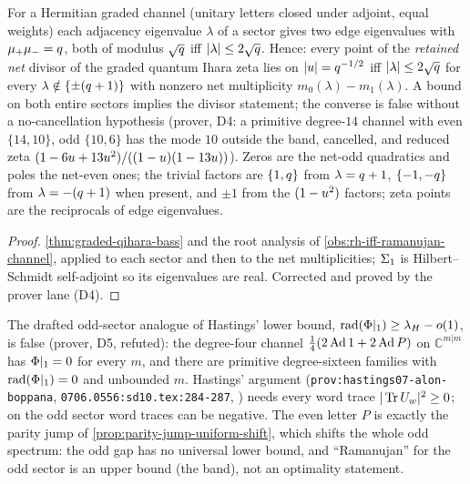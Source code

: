 \begin{corollary}
\label{cor:graded-band-circle}
For a Hermitian graded channel (unitary letters closed under adjoint, equal weights) each
adjacency eigenvalue $\lambda$ of a sector gives two edge eigenvalues with $\mu_+\mu_- =
q$, both of modulus $\sqrt{q}$ iff $|\lambda|\le2\sqrt{q}$. Hence: every point of the
\emph{retained net} divisor of the graded quantum Ihara zeta lies on $|u| = q^{-1/2}$ iff
$|\lambda|\le2\sqrt{q}$ for every $\lambda\notin\{\pm(q+1)\}$ with nonzero net multiplicity
$m_0(\lambda)-m_1(\lambda)$. A bound on both entire sectors implies the divisor statement; the
converse is false without a no-cancellation hypothesis (prover, D4: a primitive degree-$14$ channel
with even $\{14,10\}$, odd $\{10,6\}$ has the mode $10$ outside the band, cancelled, and reduced
zeta $(1-6u+13u^2)/((1-u)(1-13u))$). Zeros are the net-odd quadratics and poles the net-even
ones; the trivial factors are $\{1,q\}$ from $\lambda = q+1$, $\{-1,-q\}$ from $\lambda =
-(q+1)$ when present, and $\pm1$ from the $(1-u^2)$ factors; zeta points are the reciprocals of
edge eigenvalues.
\end{corollary}
\begin{proof}
\cref{thm:graded-qihara-bass} and the root analysis of \cref{obs:rh-iff-ramanujan-channel}, applied
to each sector and then to the net multiplicities; $\Sigma_1$ is Hilbert--Schmidt self-adjoint so its
eigenvalues are real. Corrected and proved by the prover lane (D4).
\end{proof}

\begin{observation}
\label{obs:odd-gap-no-alon-boppana}
The drafted odd-sector analogue of Hastings' lower bound, $\operatorname{rad}(\Phi|_1)\ge\lambda_H-o(1)$, is
false (prover, D5, refuted): the degree-four channel $\tfrac14(2\operatorname{Ad}1+2\operatorname{Ad} P)$ on
$\mathbb C^{m|m}$ has $\Phi|_1 = 0$ for every $m$, and there are primitive degree-sixteen
families with $\operatorname{rad}(\Phi|_1) = 0$ and unbounded $m$. Hastings' argument
(\texttt{prov:hastings07-alon-boppana}, \texttt{0706.0556:sd10.tex:284-287},
{\small\texttt{}})
needs every word trace $|\operatorname{Tr} U_w|^2\ge0$; on the odd sector word traces can be negative. The
even letter $P$ is exactly the parity jump of \cref{prop:parity-jump-uniform-shift}, which shifts
the whole odd spectrum: the odd gap has no universal lower bound, and ``Ramanujan'' for the odd
sector is an upper bound (the band), not an optimality statement.
\end{observation}

